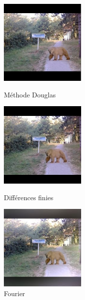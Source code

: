 \documentclass{article}
\begin{document}
\begin{figure}[!htb]
   \begin{minipage}{0.33\textwidth}
     \centering
     \includegraphics[width = 120pt]{Annexe/OursD.png}
     \caption{Méthode Douglas}
      \end{minipage}\hfill
   \begin{minipage}{0.33\textwidth}
     \centering
     \includegraphics[width = 120pt]{Annexe/OursDF.png}
     \caption{Différences finies}
      \end{minipage}\hfill
   \begin{minipage}{0.33\textwidth}
     \centering
     \includegraphics[width= 120pt]{Annexe/OursF.png}
     \caption{Fourier}
   \end{minipage}
\end{figure}
\end{document}
